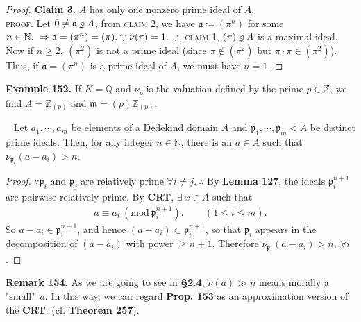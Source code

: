 \documentclass[12pt,a4paper,footinclude=true,headinclude=true]{scrbook} %
\newcommand{\trianglerightneq}{\mathrel{\ooalign{\raisebox{-0.5ex}{\reflectbox{\rotatebox{90}{$\nshortmid$}}}\cr$\triangleright$\cr}\mkern-3mu}}
\newcommand{\triangleleftneq}{\mathrel{\reflectbox{$\trianglerightneq$}}}
\newenvironment{proposition}[2][]
{\renewcommand\theinnercustomprop{#2}\innercustomprop[#1] 
\begin{mdframed}[backgroundcolor=gray!20]\ }
{\end{mdframed}\endinnercustomprop}
\newenvironment{remark}[2][Remark]
    { \begin{mdframed}[backgroundcolor=gray!20] \textbf{#1 #2.} }
    {  \end{mdframed}}
\newenvironment{example}[2][Example]
    { \begin{mdframed}[backgroundcolor=gray!20] \textbf{#1 #2.} }
    {  \end{mdframed}}
\begin{document}
\begin{proof}
    \textbf{Claim 3.} $A$ has only one nonzero prime ideal of $A$.\\
    \textsc{proof.} Let $0\neq\mathfrak{a}\triangleleftneq A$, from \textsc{claim 2}, we have $\mathfrak{a}\coloneqq(\pi^n)$ for some $n\in\mathbb{N}.\ \Rightarrow \mathfrak{a}=(\pi^n)=(\pi).\\ \because \nu(\pi)=1.\ \therefore$ \textsc{claim 1}, $(\pi)\triangleleftneq A$ is a maximal ideal. Now if $n\geq2,\ (\pi^2)$ is not a prime ideal (since $\pi\notin(\pi^2)$ but $\pi\cdot \pi\in(\pi^2)$). Thus, if $\mathfrak{a}=(\pi^n)$ is a prime ideal of $A$, we must have $n=1$.
\end{proof}

\begin{example}{152}
    If $K=\mathbb{Q}$ and $\nu_p$ is the valuation defined by the prime $p\in\mathbb{Z}$, we find $A=\mathbb{Z}_{(p)}$ and $\mathfrak{m}=(p)\mathbb{Z}_{(p)}$. 
\end{example}

\begin{proposition}{153}
    Let $a_1,\cdots,a_m$ be elements of a Dedekind domain $A$ and $\mathfrak{p}_1,\cdots ,\mathfrak{p}_m\triangleleft A$ be distinct prime ideals. Then, for any integer $n\in\mathbb{N}$, there is an $a\in A$ such that $\nu_{\mathfrak{p}_i}(a-a_i)>n$. 
\end{proposition}
\begin{proof}
    $\because \mathfrak{p}_i$ and $\mathfrak{p}_j$ are relatively prime $\forall i\neq j.\ \therefore$ By \textbf{Lemma 127}, the ideals $\mathfrak{p}_i^{n+1}$ are pairwise relatively prime. By \textbf{CRT}, $\exists\ x\in A$ such that 
    \begin{align*}
        a\equiv a_i\ (\mathrm{mod}\ \mathfrak{p}_i^{n+1}),\qquad (1\leq i\leq m).
    \end{align*}
    So $a-a_i\in\mathfrak{p}_i^{n+1}$, and hence $(a-a_i)\subset\mathfrak{p}_i^{n+1}$, so that $\mathfrak{p}_i$ appears in the decomposition of $(a-a_i)$ with power $\geq n+1$. Therefore $\nu_{\mathfrak{p}_i}(a-a_i)>n,\ \forall i$.
\end{proof}

\begin{remark}{154}
    As we are going to see in \textbf{\S 2.4}, $\nu(a)\gg n$ means morally a "{}small"\  $a$. In this way, we can regard \textbf{Prop. 153} as an approximation version of the \textbf{CRT}. (cf. \textbf{Theorem 257}).
\end{remark}
\newpage
\end{document}
